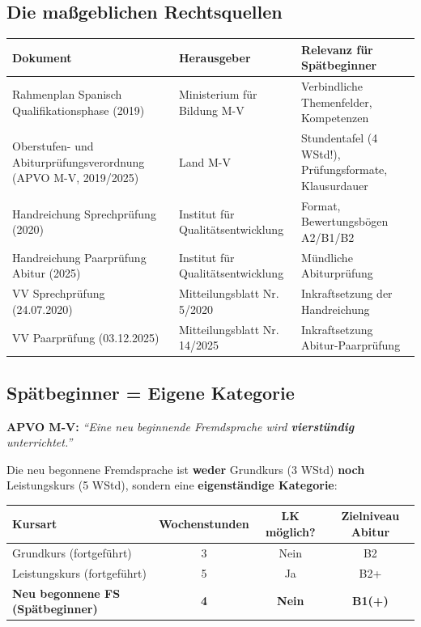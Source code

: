 \documentclass[10pt,a4paper]{article}
\begin{document}
\subsection{Die maßgeblichen Rechtsquellen}

\begin{center}
\small
\begin{tabular}{|p{5cm}|p{3.5cm}|p{5cm}|}
\hline
\rowcolor{spaet}\color{white}\textbf{Dokument} & \color{white}\textbf{Herausgeber} & \color{white}\textbf{Relevanz für Spätbeginner} \\
\hline
Rahmenplan Spanisch Qualifikationsphase (2019) & Ministerium für Bildung M-V & Verbindliche Themenfelder, Kompetenzen \\
\hline
Oberstufen- und Abiturprüfungsverordnung (APVO M-V, 2019/2025) & Land M-V & Stundentafel (4 WStd!), Prüfungsformate, Klausurdauer \\
\hline
Handreichung Sprechprüfung (2020) & Institut für Qualitätsentwicklung & Format, Bewertungsbögen A2/B1/B2 \\
\hline
Handreichung Paarprüfung Abitur (2025) & Institut für Qualitätsentwicklung & Mündliche Abiturprüfung \\
\hline
VV Sprechprüfung (24.07.2020) & Mitteilungsblatt Nr. 5/2020 & Inkraftsetzung der Handreichung \\
\hline
VV Paarprüfung (03.12.2025) & Mitteilungsblatt Nr. 14/2025 & Inkraftsetzung Abitur-Paarprüfung \\
\hline
\end{tabular}
\end{center}

\subsection{Spätbeginner = Eigene Kategorie}

\begin{rechtbox}
\textbf{APVO M-V:} \textit{``Eine neu beginnende Fremdsprache wird \textbf{vierstündig} unterrichtet.''}
\end{rechtbox}

Die neu begonnene Fremdsprache ist \textbf{weder} Grundkurs (3 WStd) \textbf{noch} Leistungskurs (5 WStd), sondern eine \textbf{eigenständige Kategorie}:

\begin{center}
\begin{tabular}{|l|c|c|c|}
\hline
\rowcolor{lightgray}
\textbf{Kursart} & \textbf{Wochenstunden} & \textbf{LK möglich?} & \textbf{Zielniveau Abitur} \\
\hline
Grundkurs (fortgeführt) & 3 & Nein & B2 \\
\hline
Leistungskurs (fortgeführt) & 5 & Ja & B2+ \\
\hline
\rowcolor{lightspaet}
\textbf{Neu begonnene FS (Spätbeginner)} & \textbf{4} & \textbf{Nein} & \textbf{B1(+)} \\
\hline
\end{tabular}
\end{center}
\end{document}
